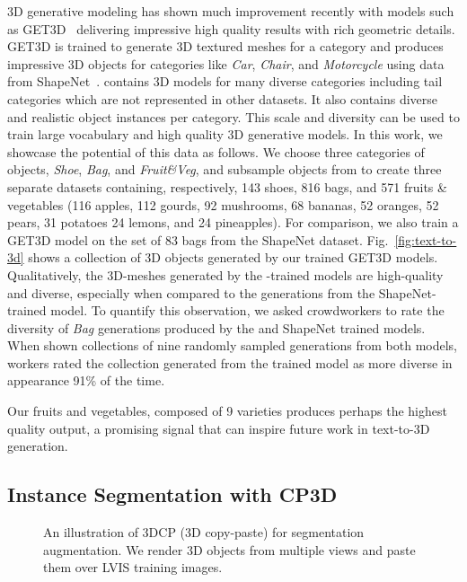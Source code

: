 3D generative modeling has shown much improvement recently with models such as GET3D~\cite{gao2022get3d} delivering impressive high quality results with rich geometric details. GET3D is trained to generate 3D textured meshes for a category and produces impressive 3D objects for categories like \emph{Car}, \emph{Chair}, and \emph{Motorcycle} using data from ShapeNet~\cite{chang2015shapenet}. \data contains 3D models for many diverse categories including tail categories which are not represented in other datasets. It also contains diverse and realistic object instances per category. This scale and diversity can be used to train large vocabulary and high quality 3D generative models. In this work, we showcase the potential of this data as follows. We choose three categories of objects, \emph{Shoe}, \emph{Bag}, and \emph{Fruit\&Veg}, and subsample objects from \data to create three separate datasets containing, respectively, 143 shoes, 816 bags, and 571 fruits \& vegetables (116 apples, 112 gourds, 92 mushrooms, 68 bananas, 52 oranges, 52 pears, 31 potatoes 24 lemons, and 24 pineapples). For comparison, we also train a GET3D model on the set of 83 bags from the ShapeNet dataset. Fig.~\ref{fig:text-to-3d} shows a collection of 3D objects generated by our trained GET3D models. Qualitatively, the 3D-meshes generated by the \data-trained models are high-quality and diverse, especially when compared to the generations from the ShapeNet-trained model. To quantify this observation, we asked crowdworkers to rate the diversity of \emph{Bag} generations produced by the \data and ShapeNet trained models. When shown collections of nine randomly sampled generations from both models, workers rated the collection generated from the \data trained model as more diverse in appearance 91\% of the time.

Our fruits and vegetables, composed of 9 varieties produces perhaps the highest quality output, a promising signal that can inspire future work in text-to-3D generation.

\subsection{Instance Segmentation with CP3D}

\begin{figure}
    \vspace{-0.215in}
    \centering
    \vspace{-0.31in}
    \caption{An illustration of 3DCP (3D copy-paste) for segmentation augmentation. We render 3D objects from multiple views and paste them over LVIS training images.}
    \label{fig:copy-paste-seg}
    \vspace{-1em}
\end{figure}

